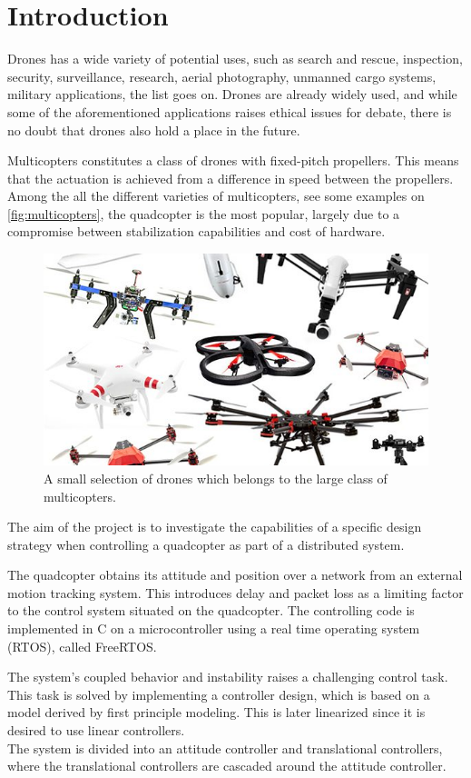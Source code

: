 \chapter{Introduction}
Drones has a wide variety of potential uses, such as search and rescue, inspection, security, surveillance, research, aerial photography, unmanned cargo systems, military applications, the list goes on. Drones are already widely used, and while some of the aforementioned applications raises ethical issues for debate, there is no doubt that drones also hold a place in the future.

Multicopters constitutes a class of drones with fixed-pitch propellers. This means that the actuation is achieved from a difference in speed between the propellers. Among the all the different varieties of multicopters, see some examples on \autoref{fig:multicopters}, the quadcopter is the most popular, largely due to a compromise between stabilization capabilities and cost of hardware. \cite{TypesOfMulticopter}

\begin{figure}[H]
  \centering
  \includegraphics[width=.6\linewidth]{figures/multicopters}
  \caption{A small selection of drones which belongs to the large class of multicopters. \cite{multiCopterPhoto}}
  \label{fig:multicopters}
\end{figure}

The aim of the project is to investigate the capabilities of a specific design strategy when controlling a quadcopter as part of a distributed system.

The quadcopter obtains its attitude and position over a network from an external motion tracking system. This introduces delay and packet loss as a limiting factor to the control system situated on the quadcopter. The controlling code is implemented in C on a microcontroller using a real time operating system (RTOS), called FreeRTOS.

The system's coupled behavior and instability raises a challenging control task. This task is solved by implementing a controller design, which is based on a model derived by first principle modeling. This is later linearized since it is desired to use linear controllers.\\
The system is divided into an attitude controller and translational controllers, where the translational controllers are cascaded around the attitude controller.

